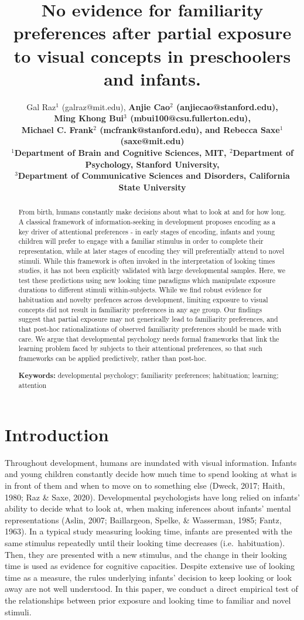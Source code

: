 \documentclass[10pt, letterpaper]{article}
\title{No evidence for familiarity preferences after partial exposure to
visual concepts in preschoolers and infants.}
\author{Gal Raz$^1$ (galraz@mit.edu), \bf{Anjie Cao$^2$  (anjiecao@stanford.edu)},\\ \bf{Ming Khong Bui$^3$  (mbui100@csu.fullerton.edu)}, \\ \bf{Michael C. Frank$^2$ (mcfrank@stanford.edu)},
 and \bf{Rebecca Saxe$^1$ (saxe@mit.edu)} \\
$^1$Department of Brain and Cognitive Sciences, MIT, $^2$Department of Psychology, Stanford University, \\ $^3$Department of Communicative Sciences and Disorders, California State University \\
}
\begin{document}
\maketitle

\begin{abstract}
From birth, humans constantly make decisions about what to look at and
for how long. A classical framework of information-seeking in
development proposes encoding as a key driver of attentional preferences
- in early stages of encoding, infants and young children will prefer to
engage with a familiar stimulus in order to complete their
representation, while at later stages of encoding they will
preferentially attend to novel stimuli. While this framework is often
invoked in the interpretation of looking times studies, it has not been
explicitly validated with large developmental samples. Here, we test
these predictions using new looking time paradigms which manipulate
exposure durations to different stimuli within-subjects. While we find
robust evidence for habituation and novelty prefences across
development, limiting exposure to visual concepts did not result in
familiarity preferences in any age group. Our findings suggest that
partial exposure may not generically lead to familiarity preferences,
and that post-hoc rationalizations of observed familiarity preferences
should be made with care. We argue that developmental psychology needs
formal frameworks that link the learning problem faced by subjects to
their attentional preferences, so that such frameworks can be applied
predictively, rather than post-hoc.

\textbf{Keywords:}
developmental psychology; familiarity preferences; habituation;
learning; attention
\end{abstract}

\hypertarget{introduction}{%
\section{Introduction}\label{introduction}}

Throughout development, humans are inundated with visual information.
Infants and young children constantly decide how much time to spend
looking at what is in front of them and when to move on to something
else (Dweck, 2017; Haith, 1980; Raz \& Saxe, 2020). Developmental
psychologists have long relied on infants' ability to decide what to
look at, when making inferences about infants' mental representations
(Aslin, 2007; Baillargeon, Spelke, \& Wasserman, 1985; Fantz, 1963). In
a typical study measuring looking time, infants are presented with the
same stimulus repeatedly until their looking time decreases
(i.e.~habituation). Then, they are presented with a new stimulus, and
the change in their looking time is used as evidence for cognitive
capacities. Despite extensive use of looking time as a measure, the
rules underlying infants' decision to keep looking or look away are not
well understood. In this paper, we conduct a direct empirical test of
the relationships between prior exposure and looking time to familiar
and novel stimuli.
\end{document}
